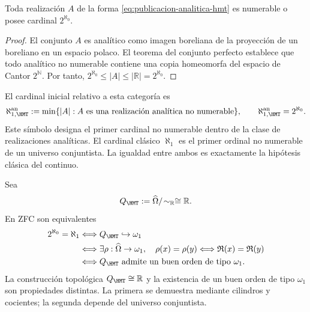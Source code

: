 \begin{theorem}
\label{thm:dicotomia-cardinal-analitica}
Toda realización \(A\) de la forma
\eqref{eq:publicacion-analitica-hmt} es numerable o posee cardinal
\(2^{\aleph_0}\).
\end{theorem}

\begin{proof}
El conjunto \(A\) es analítico como imagen boreliana de la proyección de un
boreliano en un espacio polaco. El teorema del conjunto perfecto establece
que todo analítico no numerable contiene una copia homeomorfa del espacio de
Cantor \(2^{\mathbb N}\). Por tanto,
\(2^{\aleph_0}\leq|A|\leq|\mathbb R|=2^{\aleph_0}\).
\end{proof}

El cardinal inicial relativo a esta categoría es
\begin{equation}
 \aleph_{1,\HMT}^{\rm an}
 :=\min\{|A|:A\text{ es una realización analítica no numerable}\},
 \qquad
 \aleph_{1,\HMT}^{\rm an}=2^{\aleph_0}.
 \label{eq:cardinal-analitico-hmt}
\end{equation}
Este símbolo designa el primer cardinal no numerable dentro de la clase de
realizaciones analíticas. El cardinal clásico \(\aleph_1\) es el primer
ordinal no numerable de un universo conjuntista. La igualdad entre ambos es
exactamente la hipótesis clásica del continuo.

Sea
\begin{equation}
 Q_{\HMT}:=\widehat\Omega/\!\sim_{\mathbb R}\cong\mathbb R.
 \label{eq:cociente-hmt-cardinal}
\end{equation}
En ZFC son equivalentes
\begin{equation}
\begin{aligned}
 2^{\aleph_0}=\aleph_1
 &\Longleftrightarrow Q_{\HMT}\hookrightarrow\omega_1\\
 &\Longleftrightarrow
 \exists\rho:\widehat\Omega\to\omega_1,\quad
 \rho(x)=\rho(y)\Longleftrightarrow
 \mathfrak R(x)=\mathfrak R(y)\\
 &\Longleftrightarrow
 Q_{\HMT}\text{ admite un buen orden de tipo }\omega_1.
\end{aligned}
 \label{eq:equivalencias-ch-hmt}
\end{equation}
La construcción topológica
\(Q_{\HMT}\cong\mathbb R\) y la existencia de un buen orden de tipo
\(\omega_1\) son propiedades distintas. La primera se demuestra mediante
cilindros y cocientes; la segunda depende del universo conjuntista.

